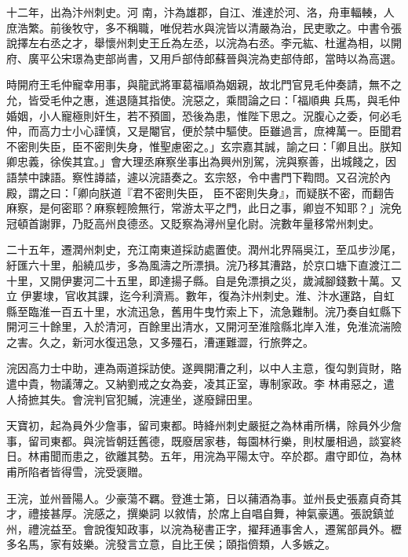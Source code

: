 \begin{pinyinscope}
 十二年，出為汴州刺史。河
 南，汴為雄郡，自江、淮達於河、洛，舟車輻輳，人庶浩繁。前後牧守，多不稱職，唯倪若水與浣皆以清嚴為治，民吏歌之。中書令張說擇左右丞之才，舉懷州刺史王丘為左丞，以浣為右丞。李元紘、杜暹為相，以開府、廣平公宋璟為吏部尚書，又用戶部侍郎蘇晉與浣為吏部侍郎，當時以為高選。



 時開府王毛仲寵幸用事，與龍武將軍葛福順為姻親，故北門官見毛仲奏請，無不之允，皆受毛仲之惠，進退隨其指使。浣惡之，乘間論之曰：「福順典
 兵馬，與毛仲婚姻，小人寵極則奸生，若不預圖，恐後為患，惟陛下思之。況腹心之委，何必毛仲，而高力士小心謹慎，又是閹官，便於禁中驅使。臣雖過言，庶裨萬一。臣聞君不密則失臣，臣不密則失身，惟聖慮密之。」玄宗嘉其誠，諭之曰：「卿且出。朕知卿忠義，徐俟其宜。」會大理丞麻察坐事出為興州別駕，浣與察善，出城餞之，因語禁中諫語。察性譐誻，遽以浣語奏之。玄宗怒，令中書門下鞫問。又召浣於內殿，謂之曰：「卿向朕道『君不密則失臣，
 臣不密則失身』，而疑朕不密，而翻告麻察，是何密耶？麻察輕險無行，常游太平之門，此日之事，卿豈不知耶？」浣免冠頓首謝罪，乃貶高州良德丞。又貶察為潯州皇化尉。浣數年量移常州刺史。



 二十五年，遷潤州刺史，充江南東道採訪處置使。潤州北界隔吳江，至瓜步沙尾，紆匯六十里，船繞瓜步，多為風濤之所漂損。浣乃移其漕路，於京口塘下直渡江二十里，又開伊婁河二十五里，即達揚子縣。自是免漂損之災，歲減腳錢數十萬。又立
 伊婁埭，官收其課，迄今利濟焉。數年，復為汴州刺史。淮、汴水運路，自虹縣至臨淮一百五十里，水流迅急，舊用牛曳竹索上下，流急難制。浣乃奏自虹縣下開河三十餘里，入於清河，百餘里出清水，又開河至淮陰縣北岸入淮，免淮流湍險之害。久之，新河水復迅急，又多殭石，漕運難澀，行旅弊之。



 浣因高力士中助，連為兩道採訪使。遂興開漕之利，以中人主意，復勾剝貨財，賂遣中貴，物議薄之。又納劉戒之女為妾，凌其正室，專制家政。李
 林甫惡之，遣人掎摭其失。會浣判官犯贓，浣連坐，遂廢歸田里。



 天寶初，起為員外少詹事，留司東都。時絳州刺史嚴挺之為林甫所構，除員外少詹事，留司東都。與浣皆朝廷舊德，既廢居家巷，每園林行樂，則杖屢相過，談宴終日。林甫聞而患之，欲離其勢。五年，用浣為平陽太守。卒於郡。肅守即位，為林甫所陷者皆得雪，浣受褒贈。



 王浣，並州晉陽人。少豪蕩不羈。登進士第，日以蒱酒為事。並州長史張嘉貞奇其才，禮接甚厚。浣感之，撰樂詞
 以敘情，於席上自唱自舞，神氣豪邁。張說鎮並州，禮浣益至。會說復知政事，以浣為秘書正字，擢拜通事舍人，遷駕部員外。櫪多名馬，家有妓樂。浣發言立意，自比王侯；頤指儕類，人多嫉之。




\end{pinyinscope}
